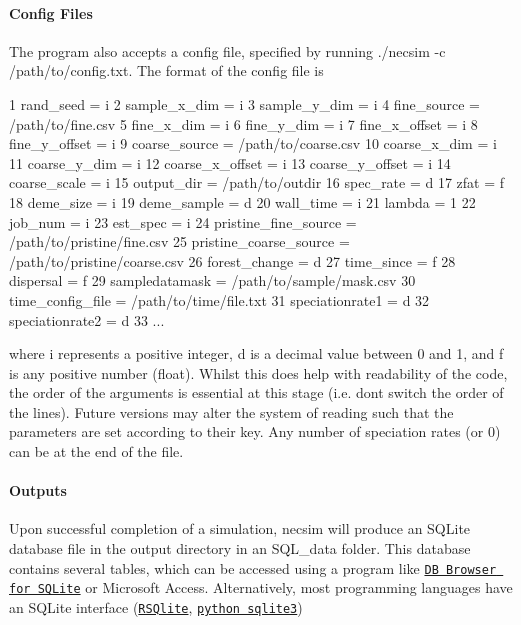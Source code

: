 \paragraph*{Config Files}

The program also accepts a config file, specified by running {\ttfamily ./necsim -\/c /path/to/config.txt}. The format of the config file is 
\begin{DoxyCode}
1 rand\_seed = i
2 sample\_x\_dim = i
3 sample\_y\_dim = i
4 fine\_source = /path/to/fine.csv
5 fine\_x\_dim = i
6 fine\_y\_dim = i
7 fine\_x\_offset = i
8 fine\_y\_offset = i
9 coarse\_source = /path/to/coarse.csv
10 coarse\_x\_dim = i
11 coarse\_y\_dim = i
12 coarse\_x\_offset = i
13 coarse\_y\_offset = i
14 coarse\_scale = i
15 output\_dir = /path/to/outdir
16 spec\_rate = d
17 zfat = f
18 deme\_size = i
19 deme\_sample = d
20 wall\_time = i
21 lambda = 1
22 job\_num = i
23 est\_spec = i
24 pristine\_fine\_source = /path/to/pristine/fine.csv
25 pristine\_coarse\_source = /path/to/pristine/coarse.csv
26 forest\_change = d
27 time\_since = f
28 dispersal = f
29 sampledatamask = /path/to/sample/mask.csv
30 time\_config\_file = /path/to/time/file.txt
31 speciationrate1 = d
32 speciationrate2 = d
33 ...
\end{DoxyCode}
 where {\ttfamily i} represents a positive integer, {\ttfamily d} is a decimal value between 0 and 1, and {\ttfamily f} is any positive number (float). Whilst this does help with readability of the code, the order of the arguments is essential at this stage (i.\+e. don\textquotesingle{}t switch the order of the lines). Future versions may alter the system of reading such that the parameters are set according to their key. Any number of speciation rates (or 0) can be at the end of the file.

\paragraph*{Outputs}

Upon successful completion of a simulation, necsim will produce an S\+Q\+Lite database file in the output directory in an S\+Q\+L\+\_\+data folder. This database contains several tables, which can be accessed using a program like \href{http://sqlitebrowser.org/}{\tt DB Browser for S\+Q\+Lite} or Microsoft Access. Alternatively, most programming languages have an S\+Q\+Lite interface (\href{https://cran.r-project.org/web/packages/RSQLite/index.html}{\tt R\+S\+Qlite}, \href{https://docs.python.org/2/library/sqlite3.html}{\tt python sqlite3})


